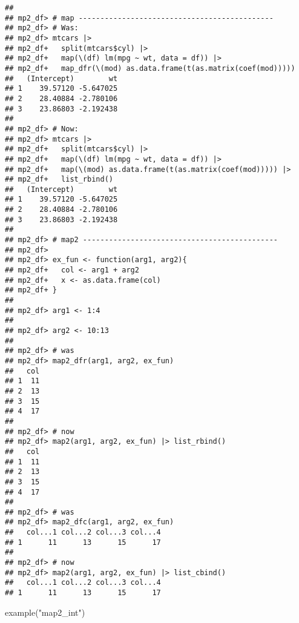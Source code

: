 \documentclass[
]{book}
\newenvironment{Shaded}{\begin{snugshade}}{\end{snugshade}}
\newcommand{\FunctionTok}[1]{\textcolor[rgb]{0.00,0.00,0.00}{#1}}
\newcommand{\NormalTok}[1]{#1}
\newcommand{\StringTok}[1]{\textcolor[rgb]{0.31,0.60,0.02}{#1}}
\begin{document}
\begin{verbatim}
## 
## mp2_df> # map ---------------------------------------------
## mp2_df> # Was:
## mp2_df> mtcars |>
## mp2_df+   split(mtcars$cyl) |>
## mp2_df+   map(\(df) lm(mpg ~ wt, data = df)) |>
## mp2_df+   map_dfr(\(mod) as.data.frame(t(as.matrix(coef(mod)))))
##   (Intercept)        wt
## 1    39.57120 -5.647025
## 2    28.40884 -2.780106
## 3    23.86803 -2.192438
## 
## mp2_df> # Now:
## mp2_df> mtcars |>
## mp2_df+   split(mtcars$cyl) |>
## mp2_df+   map(\(df) lm(mpg ~ wt, data = df)) |>
## mp2_df+   map(\(mod) as.data.frame(t(as.matrix(coef(mod))))) |>
## mp2_df+   list_rbind()
##   (Intercept)        wt
## 1    39.57120 -5.647025
## 2    28.40884 -2.780106
## 3    23.86803 -2.192438
## 
## mp2_df> # map2 ---------------------------------------------
## mp2_df> 
## mp2_df> ex_fun <- function(arg1, arg2){
## mp2_df+   col <- arg1 + arg2
## mp2_df+   x <- as.data.frame(col)
## mp2_df+ }
## 
## mp2_df> arg1 <- 1:4
## 
## mp2_df> arg2 <- 10:13
## 
## mp2_df> # was
## mp2_df> map2_dfr(arg1, arg2, ex_fun)
##   col
## 1  11
## 2  13
## 3  15
## 4  17
## 
## mp2_df> # now
## mp2_df> map2(arg1, arg2, ex_fun) |> list_rbind()
##   col
## 1  11
## 2  13
## 3  15
## 4  17
## 
## mp2_df> # was
## mp2_df> map2_dfc(arg1, arg2, ex_fun)
##   col...1 col...2 col...3 col...4
## 1      11      13      15      17
## 
## mp2_df> # now
## mp2_df> map2(arg1, arg2, ex_fun) |> list_cbind()
##   col...1 col...2 col...3 col...4
## 1      11      13      15      17
\end{verbatim}

\begin{Shaded}
\begin{Highlighting}[]
\FunctionTok{example}\NormalTok{(}\StringTok{"map2\_int"}\NormalTok{)}
\end{Highlighting}
\end{Shaded}
\end{document}
